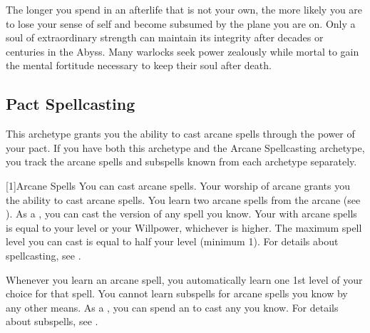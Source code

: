        The longer you spend in an afterlife that is not your own, the more likely you are to lose your sense of self and become subsumed by the plane you are on.
        Only a soul of extraordinary strength can maintain its integrity after decades or centuries in the Abyss.
        Many warlocks seek power zealously while mortal to gain the mental fortitude necessary to keep their soul after death.

    \subsection{Pact Spellcasting}
        This archetype grants you the ability to cast arcane spells through the power of your pact.
        If you have both this archetype and the Arcane Spellcasting archetype, you track the arcane spells and subspells known from each archetype separately.

        [1]{Arcane Spells}
        You can cast arcane spells.
        Your worship of arcane grants you the ability to cast arcane spells.
        You learn two arcane spells from the arcane  (see ).
        As a , you can cast the  version of any spell you know.
        Your  with arcane spells is equal to your level or your Willpower, whichever is higher.
        The maximum spell level you can cast is equal to half your level (minimum 1).
        For details about spellcasting, see .

        Whenever you learn an arcane spell, you automatically learn one 1st level  of your choice for that spell.
        You cannot learn subspells for arcane spells you know by any other means.
        As a , you can spend an  to cast any  you know.
        For details about subspells, see .

